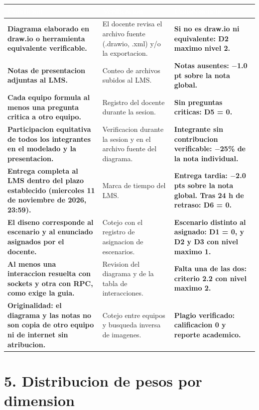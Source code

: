 \documentclass[10pt]{article}
\begin{document}
\renewcommand{\arraystretch}{1.25}
\begin{xltabular}{\textwidth}{|>{\RaggedRight\bfseries\color{uteqBlue}}p{6.5cm}|>{\RaggedRight}X|>{\RaggedRight\bfseries\color{uteqRed}}p{5.5cm}|}
	\hline
	\textbf{\textcolor{white}{Condicion}} & \textbf{\textcolor{white}{Verificacion}} & \textbf{\textcolor{white}{Consecuencia}}\\
	\hline
	\endhead
	Diagrama elaborado en draw.io o herramienta equivalente verificable. & El docente revisa el archivo fuente (.drawio, .xml) y/o la exportacion. & Si no es draw.io ni equivalente: D2 maximo nivel 2.\\
	\hline
	Notas de presentacion adjuntas al LMS. & Conteo de archivos subidos al LMS. & Notas ausentes: $-$1.0 pt sobre la nota global.\\
	\hline
	Cada equipo formula al menos una pregunta critica a otro equipo. & Registro del docente durante la sesion. & Sin preguntas criticas: D5 = 0.\\
	\hline
	Participacion equitativa de todos los integrantes en el modelado y la presentacion. & Verificacion durante la sesion y en el archivo fuente del diagrama. & Integrante sin contribucion verificable: $-$25\% de la nota individual.\\
	\hline
	Entrega completa al LMS dentro del plazo establecido (miercoles 11 de noviembre de 2026, 23:59). & Marca de tiempo del LMS. & Entrega tardia: $-$2.0 pts sobre la nota global. Tras 24 h de retraso: D6 = 0.\\
	\hline
	El diseno corresponde al escenario y al enunciado asignados por el docente. & Cotejo con el registro de asignacion de escenarios. & Escenario distinto al asignado: D1 = 0, y D2 y D3 con nivel maximo 1.\\
	\hline
	Al menos una interaccion resuelta con sockets y otra con RPC, como exige la guia. & Revision del diagrama y de la tabla de interacciones. & Falta una de las dos: criterio 2.2 con nivel maximo 2.\\
	\hline
	Originalidad: el diagrama y las notas no son copia de otro equipo ni de internet sin atribucion. & Cotejo entre equipos y busqueda inversa de imagenes. & Plagio verificado: calificacion 0 y reporte academico.\\
	\hline
\end{xltabular}

\section{5. Distribucion de pesos por dimension}
\end{document}
